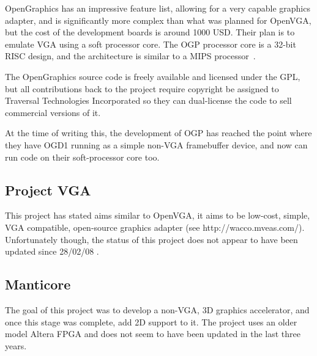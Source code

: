 OpenGraphics has an impressive feature list, allowing for a very capable graphics
adapter, and is significantly more complex than what was planned for OpenVGA, but
the cost of the development boards is around 1000 USD. Their plan is to emulate
VGA using a soft processor core. The OGP processor core is a 32-bit RISC design,
and the architecture is similar to a MIPS processor~\cite{OpenGraphics}.

The OpenGraphics source code is freely available and licensed under the GPL, but
all contributions back to the project require copyright be assigned to Traversal
Technologies Incorporated so they can dual-license the code to sell commercial
versions of it.

At the time of writing this, the development of OGP has reached the point where
they have OGD1 running as a simple non-VGA framebuffer device, and now can run
code on their soft-processor core too.


\subsection{Project VGA}


This project has stated aims similar to OpenVGA, it aims to be low-cost, simple,
VGA compatible, open-source graphics adapter (see http://wacco.mveas.com/).
Unfortunately though, the status of this project does not appear to have been
updated since 28/02/08 .


\subsection{Manticore}
The goal of this project was to develop a non-VGA, 3D graphics accelerator, and
once this stage was complete, add 2D support to it. The project uses an older model
Altera FPGA and does not seem to have been updated in the last three years.

